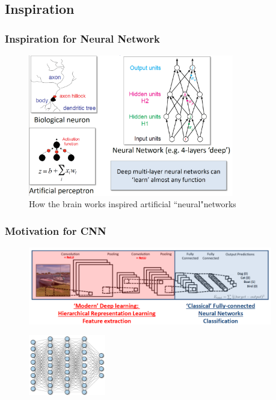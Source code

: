 \documentclass{ctexbeamer}
\begin{document}
\subsection{Inspiration}
\begin{frame}
  \frametitle{Inspiration for Neural Network}
  \begin{figure}[H]
    \centering
    \includegraphics[width=0.8\textwidth]{./figures/NN.png}
    \caption{How the brain works inspired artificial “neural"networks}
    \label{fig:nn}
  \end{figure}
\end{frame}

\begin{frame}
  \frametitle{Motivation for CNN}
  \begin{figure}[H]
    \includegraphics[width=0.95\textwidth]{./figures/motivation.png}
    \label{fig:motivation}
  \end{figure}
  \begin{figure}[H]
    \includegraphics[width=0.3\textwidth]{./figures/fc_nn.png}
    \label{fig:fc_cnn}
  \end{figure}
\end{frame}
\end{document}
